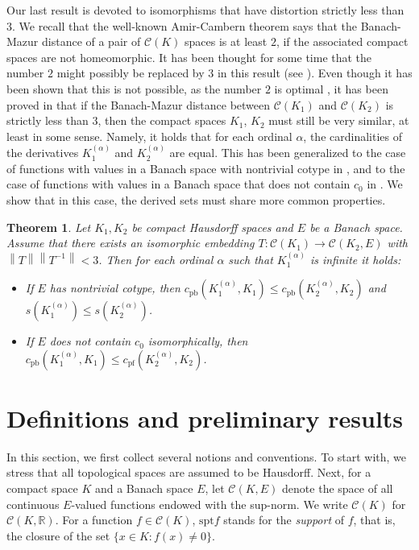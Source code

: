 \documentclass{amsart}
\numberwithin{equation}{section}
\newtheorem{thm}{Theorem}[section]
\theoremstyle{definition}
\def\C{\mathcal C}
\def\er{\mathbb R}
\newcommand{\norm}[1]{\left\|#1\right\|}
\begin{document}
Our last result is devoted to isomorphisms that have distortion strictly less than $3$. We recall that the well-known Amir-Cambern theorem says that the Banach-Mazur distance of a pair of $\C(K)$ spaces is at least $2$, if the associated compact spaces are not homeomorphic. It has been thought for some time that the number $2$ might possibly be replaced by $3$ in this result (see \cite{amir}). Even though it has been shown that this is not possible, as the number $2$ is optimal \cite{cohen-bound2}, it has been proved in \cite{Gordon3} that if the Banach-Mazur distance between $\C(K_1)$ and $\C(K_2)$ is strictly less than $3$, then the compact spaces $K_1$, $K_2$ must still be very similar, at least in some sense. Namely, it holds that for each ordinal $\alpha$, the cardinalities of the derivatives $K_1^{(\alpha)}$ and $K_2^{(\alpha)}$ are equal. This has been generalized to the case of functions with values in a Banach space with nontrivial cotype in \cite{CandidoGalego3}, and to the case of functions with values in a Banach space that does not contain $c_0$ in \cite{GalegoVillamizar}.
We show that in this case, the derived sets must share more common properties.

\begin{thm}
\label{dist3}
Let $K_1, K_2$ be compact Hausdorff spaces and $E$ be a Banach space. Assume that there exists an isomorphic embedding $T:\C(K_1) \rightarrow \C(K_2, E)$ with $\norm{T}\norm{T^{-1}}<3$. Then for each ordinal $\alpha$ such that $K_1^{(\alpha)}$ is infinite it holds:
\begin{itemize}
    \item[(i)] If $E$ has nontrivial cotype, then $c_{\text{pb}}(K_1^{(\alpha)}, K_1) \leq c_{\text{pb}}(K_2^{(\alpha)}, K_2)$ and $s(K_1^{(\alpha)}) \leq s(K_2^{(\alpha)})$.
    \item[(ii)] If $E$ does not contain $c_0$ isomorphically, then $c_{\text{pb}}(K_1^{(\alpha)}, K_1) \leq c_{\text{pf}}(K_2^{(\alpha)}, K_2)$.
\end{itemize}
\end{thm}



\section{Definitions and preliminary results}

In this section, we first collect several notions and conventions. To start with, we stress that all topological spaces are assumed to be Hausdorff. Next, for a compact space $K$ and a Banach space $E$, let $\C(K, E)$ denote the space of all continuous $E$-valued functions endowed with the sup-norm. We write $\C(K)$ for $\C(K, \er)$. For a function $f \in \C(K)$, $\text{spt} f$ stands for the \emph{support} of $f$, that is, the closure of the set $\{ x \in K: f(x) \neq 0\}$.
\end{document}
